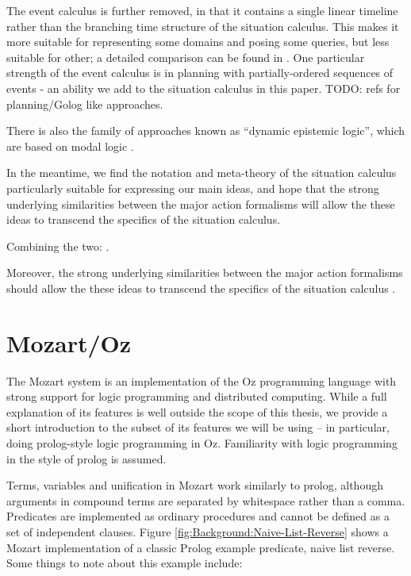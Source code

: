 The event calculus is further removed, in that it contains a single
linear timeline rather than the branching time structure of the situation
calculus. This makes it more suitable for representing some domains
and posing some queries, but less suitable for other; a detailed comparison
can be found in \citep{kowalski97reconcile_sitcalc_evtcalc,belleghem97sitcalc_evtcalc}.
One particular strength of the event calculus is in planning with
partially-ordered sequences of events - an ability we add to the situation
calculus in this paper. TODO: refs for planning/Golog like approaches.

There is also the family of approaches known as {}``dynamic epistemic
logic'', which are based on modal logic \citet{baltag98pa_ck,vanBenthem06lcc,vanBentham06tree_of_knowledge}. 

In the meantime, we find the notation and meta-theory of the situation
calculus particularly suitable for expressing our main ideas, and
hope that the strong underlying similarities between the major action
formalisms will allow the these ideas to transcend the specifics of
the situation calculus.

Combining the two: \citet{belleghem95combine_sitcalc_evtcalc} .

Moreover, the strong underlying similarities between the major action
formalisms should allow the these ideas to transcend the specifics
of the situation calculus \citet{thielscher06reconcile_sc_fc,thielscher07unifying_action_calculus,vanbentham07ml_sitcalc}.


\section{Mozart/Oz\label{sec:Background:Mozart/Oz}}

The Mozart system \citep{vanroy99mozart} is an implementation of
the Oz programming language \citep{vanRoyHaridi04ctm} with strong
support for logic programming and distributed computing. While a full
explanation of its features is well outside the scope of this thesis,
we provide a short introduction to the subset of its features we will
be using -- in particular, doing prolog-style logic programming in
Oz. Familiarity with logic programming in the style of prolog is assumed.

Terms, variables and unification in Mozart work similarly to prolog,
although arguments in compound terms are separated by whitespace rather
than a comma. Predicates are implemented as ordinary procedures and
cannot be defined as a set of independent clauses. Figure \ref{fig:Background:Naive-List-Reverse}
shows a Mozart implementation of a classic Prolog example predicate,
naive list reverse. Some things to note about this example include:

